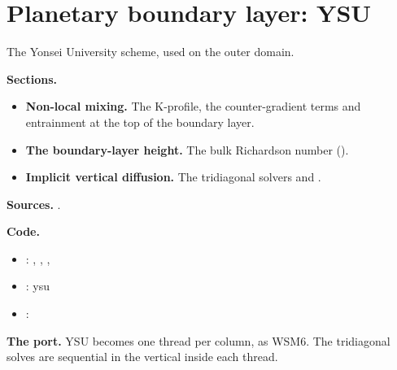 \chapter{Planetary boundary layer: YSU}\label{ch:pbl}

The Yonsei University scheme, used on the outer domain.

\begin{outline}[(card B-11)]
\textbf{Sections.}
\begin{itemize}
    \item \textbf{Non-local mixing.} The K-profile, the counter-gradient terms and entrainment at the top of the boundary layer.
    \item \textbf{The boundary-layer height.} The bulk Richardson number ().
    \item \textbf{Implicit vertical diffusion.} The tridiagonal solvers  and .
\end{itemize}
\textbf{Sources.} \citet{hong2006ysu}.

\textbf{Code.}
\begin{itemize}
    \item {}: , , , 
    \item {}: ysu
    \item {}: 
\end{itemize}
\textbf{The port.} YSU becomes one thread per column, as WSM6. The tridiagonal solves are sequential in the vertical inside each thread.
\end{outline}
